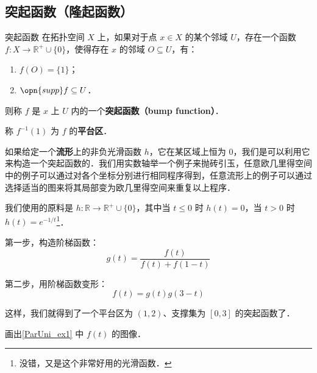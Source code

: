 \subsection{突起函数（隆起函数）}

\begin{definition}{突起函数}
在拓扑空间 $X$ 上，如果对于点 $x\in X$ 的某个邻域 $U$，存在一个函数 $f:X\to\mathbb{R}^+\cup\{0\}$，使得存在 $x$ 的邻域 $O\subseteq U$，有：
\begin{enumerate}
\item $f(O)=\{1\}$；
\item $\opn{supp} f \subseteq U$．
\end{enumerate}
则称 $f$ 是 $x$ 上 $U$ 内的一个\textbf{突起函数（bump function）}．

称 $f^{-1}(1)$ 为 $f$ 的\textbf{平台区}．
\end{definition}

如果给定一个\textbf{流形}上的非负光滑函数 $h$，它在某区域上恒为 $0$，我们是可以利用它来构造一个突起函数的．我们用实数轴举一个例子来抛砖引玉，任意欧几里得空间中的例子可以通过对各个坐标分别进行相同程序得到，任意流形上的例子可以通过选择适当的图来将其局部变为欧几里得空间来重复以上程序．

\begin{example}{}\label{ParUni_ex1}
我们使用的原料是 $h:\mathbb{R}\to\mathbb{R}^+\cup\{0\}$，其中当 $t\leq 0$ 时 $h(t)=0$，当 $t>0$ 时 $h(t)=e^{-1/t}$\footnote{没错，又是这个非常好用的光滑函数．}．

第一步，构造阶梯函数：
\begin{equation}
g(t)=\frac{f(t)}{f(t)+f(1-t)}
\end{equation}

第二步，用阶梯函数变形：
\begin{equation}
f(t)=g(t)g(3-t)
\end{equation}

这样，我们就得到了一个平台区为 $(1, 2)$、支撑集为 $[0, 3]$ 的突起函数了．
\end{example}

\begin{exercise}{}
画出\autoref{ParUni_ex1} 中 $f(t)$ 的图像．
\end{exercise}





